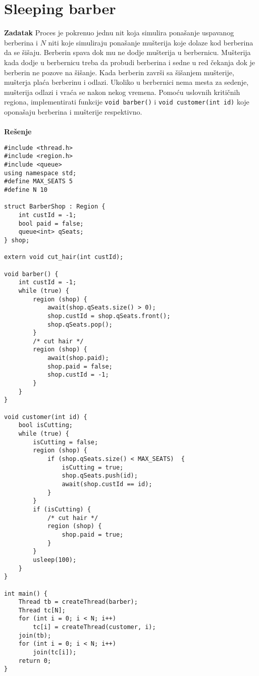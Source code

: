 \clearpage
\section{\latin Sleeping barber}
\textbf{\large Zadatak} Proces je pokrenuo jednu nit koja simulira pona\v{s}anje uspavanog berberina i $N$ niti koje simuliraju pona\v{s}anje mu\v{s}terija koje dolaze kod berberina da se \v{s}i\v{s}aju. Berberin spava dok mu ne dodje mu\v{s}terija u berbernicu. Mu\v{s}terija kada dodje u berbernicu treba da probudi berberina i sedne u red \v{c}ekanja dok je berberin ne pozove na \v{s}i\v{s}anje. Kada berberin zavr\v{s}i sa \v{s}i\v{s}anjem mu\v{s}terije, mu\v{s}terja pla\'{c}a berberinu i odlazi. Ukoliko u berbernici nema mesta za sedenje, mu\v{s}terija odlazi i vra\'{c}a se nakon nekog vremena. Pomo\'{c}u uslovnih kriti\v{c}nih regiona, implementirati funkcije \texttt{void barber()} i \texttt{void customer(int id)} koje opona\v{s}aju berberina i mu\v{s}terije respektivno.
\\\\
\textbf{\large Re\v{s}enje}
\begin{lstlisting}
#include <thread.h>
#include <region.h>
#include <queue>
using namespace std;
#define MAX_SEATS 5
#define N 10

struct BarberShop : Region {
    int custId = -1;
    bool paid = false;
    queue<int> qSeats;
} shop;

extern void cut_hair(int custId);

void barber() {
    int custId = -1;
    while (true) {
        region (shop) {
            await(shop.qSeats.size() > 0);
            shop.custId = shop.qSeats.front();
            shop.qSeats.pop();
        }
        /* cut hair */
        region (shop) {
            await(shop.paid);
            shop.paid = false;
            shop.custId = -1;
        }
    }
}

void customer(int id) {
    bool isCutting;
    while (true) {
        isCutting = false;
        region (shop) {
            if (shop.qSeats.size() < MAX_SEATS)  {
                isCutting = true;
                shop.qSeats.push(id);
                await(shop.custId == id);
            }
        }
        if (isCutting) {
            /* cut hair */
            region (shop) {
                shop.paid = true;
            }
        }
        usleep(100);
    }
}

int main() {
    Thread tb = createThread(barber);
    Thread tc[N];
    for (int i = 0; i < N; i++) 
        tc[i] = createThread(customer, i);
    join(tb);
    for (int i = 0; i < N; i++) 
        join(tc[i]);
    return 0;
}

\end{lstlisting}